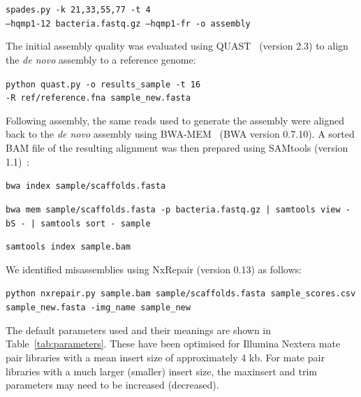 \documentclass[fleqn,10pt]{wlpeerj}
\begin{document}
\texttt{spades.py -k 21,33,55,77 -t 4 \\ --hqmp1-12 bacteria.fastq.gz  --hqmp1-fr -o assembly}

The initial assembly quality was evaluated using QUAST~\citep{gurevich2013} (version 2.3) to align the \textit{de novo} assembly to a reference genome:

\texttt{python quast.py -o results\_sample -t 16 \\  -R ref/reference.fna sample\_new.fasta }

  Following assembly, the same reads used to generate the assembly were aligned back to the \textit{de novo} assembly using BWA-MEM~\citep{li2013} (BWA version 0.7.10). A sorted BAM file of the resulting alignment was then prepared using SAMtools (version 1.1)~\citep{li2009}: 

\texttt{bwa index sample/scaffolds.fasta}

\texttt{bwa mem sample/scaffolds.fasta -p bacteria.fastq.gz | samtools view -bS - |  samtools sort - sample}

\texttt{samtools index sample.bam}

We identified misassemblies using NxRepair (version 0.13) as follows:

\texttt{python nxrepair.py sample.bam   sample/scaffolds.fasta sample\_scores.csv  sample\_new.fasta -img\_name sample\_new}


The default parameters used and their meanings are shown in Table~\ref{tab:parameters}. These have been optimised for Illumina Nextera mate pair libraries with a mean insert size of approximately 4 kb. For mate pair libraries with a much larger (smaller) insert size, the maxinsert and trim parameters may need to be increased (decreased).
\end{document}
